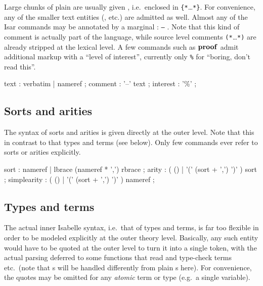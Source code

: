 Large chunks of plain  are usually given ,
i.e.\ enclosed in \verb|{*|\dots\verb|*}|.  For convenience, any of the
smaller text entities (,  etc.)  are
admitted as well.  Almost any of the Isar commands may be annotated by a
marginal : \texttt{--} .  Note that this
kind of comment is actually part of the language, while source level comments
\verb|(*|\dots\verb|*)| are already stripped at the lexical level.  A few
commands such as ${\mathord{\mathbf{proof}}}$ admit additional markup with a ``level of
interest'', currently only \texttt{\%} for ``boring, don't read this''.

\begin{rail}
  text : verbatim | nameref
  ;
  comment : '--' text
  ;
  interest : '\%'
  ;
\end{rail}


\subsection{Sorts and arities}

The syntax of sorts and arities is given directly at the outer level.  Note
that this in contrast to that types and terms (see below).  Only few commands
ever refer to sorts or arities explicitly.

\begin{rail}
  sort : nameref | lbrace (nameref * ',') rbrace
  ;
  arity : ( () | '(' (sort + ',') ')' ) sort
  ;
  simplearity : ( () | '(' (sort + ',') ')' ) nameref
  ;
\end{rail}


\subsection{Types and terms}

The actual inner Isabelle syntax, i.e.\ that of types and terms, is far too
flexible in order to be modeled explicitly at the outer theory level.
Basically, any such entity would have to be quoted at the outer level to turn
it into a single token, with the actual parsing deferred to some functions
that read and type-check terms etc.\ (note that s will be
handled differently from plain s here).  For convenience, the
quotes may be omitted for any \emph{atomic} term or type (e.g.\ a single
variable).

